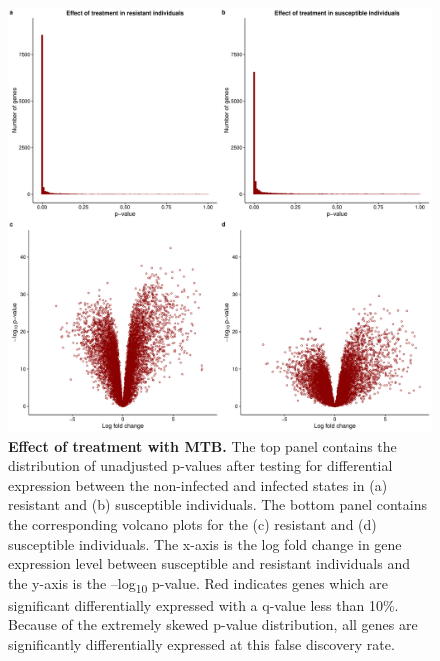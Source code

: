 \begin{figure}[ht]
\centering
\includegraphics[width=5in]{img/ch03/limma-supp.pdf}
\caption[Effect of treatment with MTB.]{
\textbf{Effect of treatment with MTB.} The top panel contains the distribution
of unadjusted p-values after testing for differential expression
between the non-infected and infected states in (a) resistant and (b)
susceptible individuals. The bottom panel contains the corresponding
volcano plots for the (c) resistant and (d) susceptible individuals.
The x-axis is the log fold change in gene expression level between
susceptible and resistant individuals and the y-axis is the
–log\textsubscript{10} p-value. Red indicates genes which are
significant differentially expressed with a q-value less than 10\%.
Because of the extremely skewed p-value distribution, all genes are
significantly differentially expressed at this false discovery rate.
}
\label{fig:limma-supp}
\end{figure}

